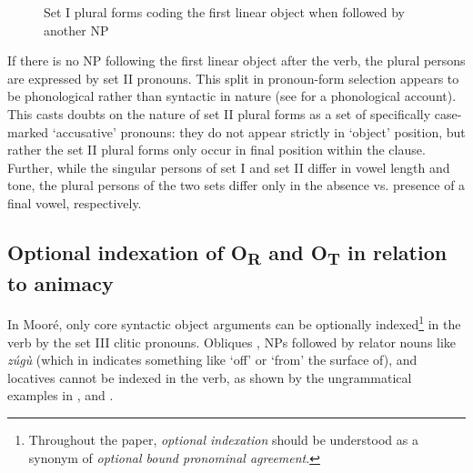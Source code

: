 \documentclass[output=paper]{langsci/langscibook}
\begin{document}
\begin{figure}[h]
\caption{Set I plural forms coding the first linear object when followed by another NP}
\label{fig:2.pacchiarotti}
\end{figure}

If there is no NP following the first linear object after the verb, the plural persons are expressed by set II pronouns. This split in pronoun-form selection appears to be phonological rather than syntactic in nature (see \citealt{peterson1971} for a phonological account). This casts doubts on the nature of set II plural forms as a set of specifically case-marked `accusative' pronouns: they do not appear strictly in `object' position, but rather the set II plural forms only occur in final position within the clause. Further, while the singular persons of set I and set II differ in vowel length and tone, the plural persons of the two sets differ only in the absence vs. presence of a final vowel, respectively. 

\subsection{Optional indexation of O\textsubscript{R} and O\textsubscript{T} in relation to animacy}\label{§4.4:optional.pacchiarotti}

In Mooré, only core syntactic object arguments can be optionally indexed\footnote{Throughout the paper, \textit{optional indexation} should be understood as a synonym of \textit{optional bound pronominal agreement}.} in the verb by the set III clitic pronouns. Obliques , NPs followed by relator nouns like \emph{zúgù} (which in  indicates something like `off' or `from' the surface of), and locatives  cannot be indexed in the verb, as shown by the ungrammatical examples in ,  and . 
\end{document}
